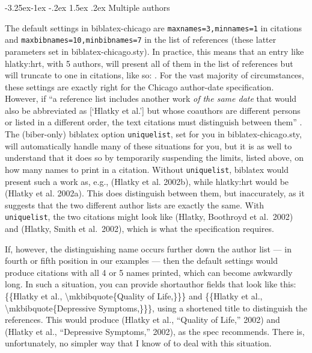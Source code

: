 \documentclass[a4paper,12pt]{article}
\makeatletter
\renewcommand{\subsection}{\@startsection{subsection}{2}{\z@}%
                                     {-3.25ex\@plus -1ex \@minus -.2ex}%
                                     {1.5ex \@plus .2ex}%
                                     {\normalfont\normalsize\bfseries}}
\makeatother
\begin{document}
\subsection{Multiple authors}
\label{sec:multiple}

The default settings in \textsf{biblatex-chicago} are
\texttt{maxnames=3,minnames=1} in citations and
\texttt{max\-bibnames=10,minbibnames=7} in the list of references
(these latter parameters set in \textsf{biblatex-chicago.sty}).  In
practice, this means that an entry like hlatky:hrt, with 5 authors,
will present all of them in the list of references but will truncate
to one in citations, like so: \autocite{hlatky:hrt}.  For the vast
majority of circumstances, these settings are exactly right for the
Chicago author-date specification.  However, if \enquote{a reference
  list includes another work \emph{of the same date} that would also
  be abbreviated as [\enquote{Hlatky et al.}] but whose coauthors are
  different persons or listed in a different order, the text citations
  must distinguish between them} \autocite[15.29]{chicago:manual}.
The (\textsf{biber}-only) \textsf{biblatex} option
\texttt{uniquelist}, set for you in \textsf{biblatex-chicago.sty},
will automatically handle many of these situations for you, but it is
as well to understand that it does so by temporarily suspending the
limits, listed above, on how many names to print in a citation.
Without \texttt{uniquelist}, \textsf{biblatex} would present such a
work as, e.g., (Hlatky et al. 2002b), while hlatky:hrt would be
(Hlatky et al. 2002a).  This does distinguish between them, but
inaccurately, as it suggests that the two different author lists are
exactly the same.  With \texttt{uniquelist}, the two citations might
look like (Hlatky, Boothroyd et al.\ 2002) and (Hlatky, Smith et al.\
2002), which is what the specification requires.

If, however, the distinguishing name occurs further down the author
list --- in fourth or fifth position in our examples --- then the
default settings would produce citations with all 4 or 5 names
printed, which can become awkwardly long.  In such a situation, you
can provide \textsf{shortauthor} fields that look like this:
\{\{Hlatky et al., \textbackslash mkbibquote\{Quality of Life,\}\}\}
and \{\{Hlatky et al., \textbackslash mkbibquote\{Depressive
Symptoms,\}\}\}, using a shortened title to distinguish the
references.  This would produce (Hlatky et al., \enquote{Quality of
  Life,} 2002) and (Hlatky et al., \enquote{Depressive Symptoms,}
2002), as the spec recommends.  There is, unfortunately, no simpler
way that I know of to deal with this situation.
\end{document}
